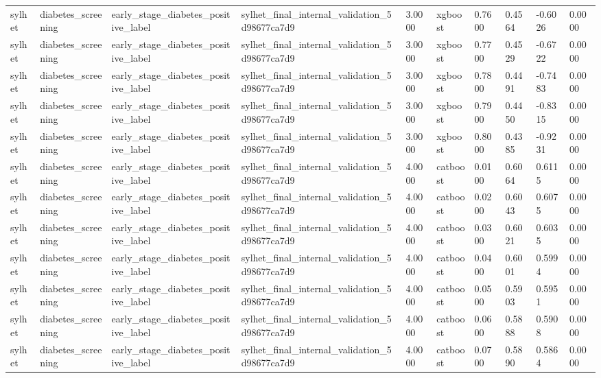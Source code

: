 \begin{tabular}{llllllllll}
sylhet & diabetes\_screening & early\_stage\_diabetes\_positive\_label & sylhet\_final\_internal\_validation\_5d98677ca7d9 & 3.0000 & xgboost & 0.7600 & 0.4564 & -0.6026 & 0.0000 \\
sylhet & diabetes\_screening & early\_stage\_diabetes\_positive\_label & sylhet\_final\_internal\_validation\_5d98677ca7d9 & 3.0000 & xgboost & 0.7700 & 0.4529 & -0.6722 & 0.0000 \\
sylhet & diabetes\_screening & early\_stage\_diabetes\_positive\_label & sylhet\_final\_internal\_validation\_5d98677ca7d9 & 3.0000 & xgboost & 0.7800 & 0.4491 & -0.7483 & 0.0000 \\
sylhet & diabetes\_screening & early\_stage\_diabetes\_positive\_label & sylhet\_final\_internal\_validation\_5d98677ca7d9 & 3.0000 & xgboost & 0.7900 & 0.4450 & -0.8315 & 0.0000 \\
sylhet & diabetes\_screening & early\_stage\_diabetes\_positive\_label & sylhet\_final\_internal\_validation\_5d98677ca7d9 & 3.0000 & xgboost & 0.8000 & 0.4385 & -0.9231 & 0.0000 \\
sylhet & diabetes\_screening & early\_stage\_diabetes\_positive\_label & sylhet\_final\_internal\_validation\_5d98677ca7d9 & 4.0000 & catboost & 0.0100 & 0.6064 & 0.6115 & 0.0000 \\
sylhet & diabetes\_screening & early\_stage\_diabetes\_positive\_label & sylhet\_final\_internal\_validation\_5d98677ca7d9 & 4.0000 & catboost & 0.0200 & 0.6043 & 0.6075 & 0.0000 \\
sylhet & diabetes\_screening & early\_stage\_diabetes\_positive\_label & sylhet\_final\_internal\_validation\_5d98677ca7d9 & 4.0000 & catboost & 0.0300 & 0.6021 & 0.6035 & 0.0000 \\
sylhet & diabetes\_screening & early\_stage\_diabetes\_positive\_label & sylhet\_final\_internal\_validation\_5d98677ca7d9 & 4.0000 & catboost & 0.0400 & 0.6001 & 0.5994 & 0.0000 \\
sylhet & diabetes\_screening & early\_stage\_diabetes\_positive\_label & sylhet\_final\_internal\_validation\_5d98677ca7d9 & 4.0000 & catboost & 0.0500 & 0.5903 & 0.5951 & 0.0000 \\
sylhet & diabetes\_screening & early\_stage\_diabetes\_positive\_label & sylhet\_final\_internal\_validation\_5d98677ca7d9 & 4.0000 & catboost & 0.0600 & 0.5888 & 0.5908 & 0.0000 \\
sylhet & diabetes\_screening & early\_stage\_diabetes\_positive\_label & sylhet\_final\_internal\_validation\_5d98677ca7d9 & 4.0000 & catboost & 0.0700 & 0.5890 & 0.5864 & 0.0000 \\

\end{tabular}
